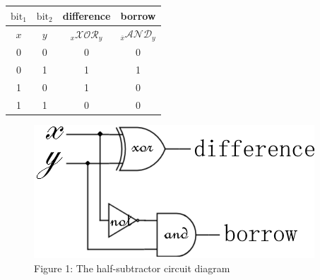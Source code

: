 \documentclass[oneside]{book}
\begin{document}
\begin{center}
\begin{tabular}{|c|c|c|c|}
\hline
$\mathrm{bit}_1$ & $\mathrm{bit}_2$ & difference & borrow \\
\hline
$x$ & $y$ & $_x\mathcal{XOR}_y$ & $_{\overline{x}}\mathcal{AND}_y$ \\
\hline
0 & 0 & 0 &0 \\
\hline
0 & 1 & 1 & 1 \\
\hline
1 & 0 & 1 & 0\\
\hline
1 & 1 & 0 & 0\\
\hline
\end{tabular}
\end{center}
\begin{figure}[h]
\centering
\includegraphics[scale=0.75]{halfsub}
\captionsetup{labelformat=empty}
\caption{Figure 1: The half-subtractor circuit diagram}
\end{figure}
\end{document}
